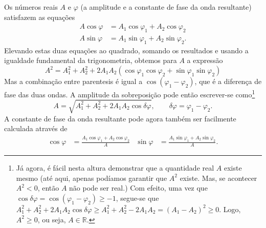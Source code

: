 Os números reais $A$ e $\varphi$ (a amplitude e a constante de fase da onda
resultante) satisfazem as equações
\begin{align*}
A\cos\varphi&=A_1\cos\varphi_1+A_2\cos\varphi_2\\
A\sin\varphi&=A_1\sin\varphi_1+A_2\sin\varphi_2.
\end{align*}
Elevando estas duas equações ao quadrado, somando os resultados e usando a
igualdade fundamental da trigonometria, obtemos para $A$ a expressão
\begin{equation}
A^2=A_1^2 +
  A_2^2 + 2A_1A_2(\cos\varphi_1\cos\varphi_2+\sin\varphi_1\sin\varphi_2)
\end{equation}
Mas a combinação entre parentesis é igual a $\cos(\varphi_1-\varphi_2)$, que é a
diferença de fase das duas ondas. A amplitude da sobreposição pode então
escrever-se como\footnote{Já agora, é fácil nesta altura demonstrar que a
quantidade real $A$ existe mesmo (até aqui, apenas podíamos garantir que $A^2$
existe. Mas, se acontecer $A^2<0$, então $A$ não pode ser real.) Com efeito, uma
vez que $\cos\delta\varphi=\cos(\varphi_1-\varphi_2)\geq-1$, segue-se que
$A_1^2+A_2^2+2A_1A_2\cos\delta\varphi\geq A_1^2+A_2^2-2A_1A_2=(A_1-A_2)^2\geq
0$. Logo, $A^2\geq0$, ou seja, $A\in
\mathbb{R}$.}
\begin{equation}
A=\sqrt{A_1^2+A_2^2+2A_1A_2\cos\delta\varphi},\qquad
\delta\varphi=\varphi_1-\varphi_2.
\end{equation}
%
A constante de fase da onda resultante pode agora também ser facilmente
calculada através de
\begin{align}
\cos\varphi&=\frac{A_1\cos\varphi_1+A_2\cos\varphi_2}{A}&
\sin\varphi&=\frac{A_1\sin\varphi_1+A_2\sin\varphi_2}{A}.
\end{align}

